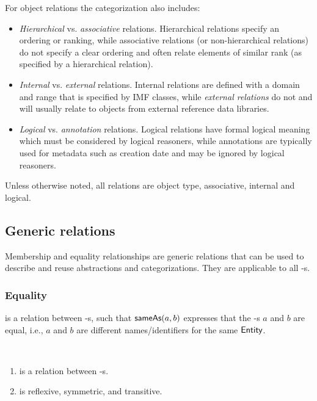 For object relations the categorization also includes:

\begin{itemize}
\item \emph{Hierarchical} vs. \emph{associative} relations. Hierarchical relations
specify an ordering or ranking, while associative relations (or
non-hierarchical relations) do not specify a clear ordering and
often relate elements of similar rank (as specified by a
hierarchical relation).
\item \emph{Internal} vs. \emph{external} relations. Internal relations are defined
with a domain and range that is specified by IMF classes, while
\emph{external relations} do not and will usually relate to objects from
external reference data libraries.
\item \emph{Logical} vs. \emph{annotation} relations. Logical relations have formal
logical meaning which must be considered by logical reasoners, while
annotations are typically used for metadata such as creation date
and may be ignored by logical reasoners.
\end{itemize}


Unless otherwise noted, all relations are object type, associative,
internal and logical.


\subsection{Generic relations}

Membership and equality relationships are generic
relations that can be used to describe and reuse abstractions and
categorizations. They are applicable to all -s.


\subsubsection{Equality}

 is a relation between
-s, such that $\textsf{sameAs}(a,b)$ expresses that
the -s $a$ and $b$ are equal,
i.e., $a$ and $b$ are different names/identifiers for the same $\textsf{Entity}$.

\begin{axioms}~
  \begin{enumerate}[resume=axioms,{label=(\arabic*)}]
  \item {} is a relation between -s.
  \item {} is reflexive, symmetric, and transitive.
  \end{enumerate}
\end{axioms}

